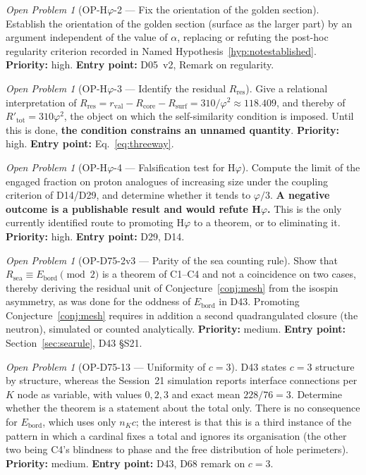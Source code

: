 \documentclass[11pt,a4paper]{article}
\newcommand{\Rsea}{R_{\mathrm{sea}}}
\newcommand{\Rres}{R_{\mathrm{res}}}
\theoremstyle{plain}
\theoremstyle{definition}
\theoremstyle{remark}
\newtheorem{openproblem}[theorem]{Open Problem}
\newcommand{\rval}{r_{\mathrm{val}}}
\newcommand{\Rsurf}{R_{\mathrm{surf}}}
\begin{document}
\begin{openproblem}[OP-H$\varphi$-2 --- Fix the orientation of the golden section]
\label{op:Hphi2}
Establish the orientation of the golden section (surface as the larger part) by an argument independent of the value of $\alpha$, replacing or refuting the post-hoc regularity criterion recorded in Named Hypothesis~\ref{hyp:notestablished}. \textbf{Priority:} high. \textbf{Entry point:} D05~v2, Remark on regularity.
\end{openproblem}

\begin{openproblem}[OP-H$\varphi$-3 --- Identify the residual $\Rres$]
\label{op:Hphi3}
Give a relational interpretation of $\Rres=\rval-R_{\mathrm{core}}-\Rsurf=310/\varphi^2\approx118.409$, and thereby of $R'_{\mathrm{tot}}=310\varphi^2$, the object on which the self-similarity condition is imposed. Until this is done, \textbf{the condition constrains an unnamed quantity}. \textbf{Priority:} high. \textbf{Entry point:} Eq.~\eqref{eq:threeway}.
\end{openproblem}

\begin{openproblem}[OP-H$\varphi$-4 --- Falsification test for H$\varphi$]
\label{op:Hphi4}
Compute the limit of the engaged fraction on proton analogues of increasing size under the coupling criterion of D14/D29, and determine whether it tends to $\varphi/3$. \textbf{A negative outcome is a publishable result and would refute H$\varphi$.} This is the only currently identified route to promoting H$\varphi$ to a theorem, or to eliminating it. \textbf{Priority:} high. \textbf{Entry point:} D29, D14.
\end{openproblem}

\begin{openproblem}[OP-D75-2v3 --- Parity of the sea counting rule]
\label{op:D752v3}
Show that $\Rsea\equiv E_{\mathrm{bord}} \pmod 2$ is a theorem of C1--C4 and not a coincidence on two cases, thereby deriving the residual unit of Conjecture~\ref{conj:mesh} from the isospin asymmetry, as was done for the oddness of $E_{\mathrm{bord}}$ in D43. Promoting Conjecture~\ref{conj:mesh} requires in addition a second quadrangulated closure (the neutron), simulated or counted analytically. \textbf{Priority:} medium. \textbf{Entry point:} Section~\ref{sec:searule}, D43 §S21.
\end{openproblem}

\begin{openproblem}[OP-D75-13 --- Uniformity of $c=3$]
\label{op:D7513}
D43 states $c=3$ structure by structure, whereas the Session~21 simulation reports interface connections per $K$ node as variable, with values $0,2,3$ and exact mean $228/76=3$. Determine whether the theorem is a statement about the total only. There is no consequence for $E_{\mathrm{bord}}$, which uses only $n_K c$; the interest is that this is a third instance of the pattern in which a cardinal fixes a total and ignores its organisation (the other two being C4's blindness to phase and the free distribution of hole perimeters). \textbf{Priority:} medium. \textbf{Entry point:} D43, D68 remark on $c=3$.
\end{openproblem}
\end{document}
